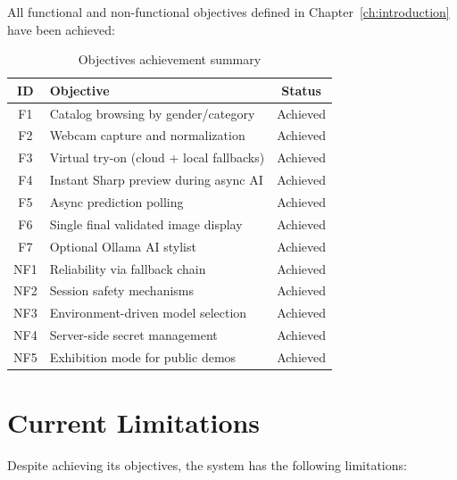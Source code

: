 All functional and non-functional objectives defined in Chapter~\ref{ch:introduction} have been achieved:

\begin{table}[H]
  \centering
  \caption{Objectives achievement summary}
  \label{tab:objectives-achieved}
  \begin{tabular}{@{}clc@{}}
    \toprule
    \textbf{ID} & \textbf{Objective} & \textbf{Status} \\
    \midrule
    F1 & Catalog browsing by gender/category & Achieved \\
    F2 & Webcam capture and normalization & Achieved \\
    F3 & Virtual try-on (cloud + local fallbacks) & Achieved \\
    F4 & Instant Sharp preview during async AI & Achieved \\
    F5 & Async prediction polling & Achieved \\
    F6 & Single final validated image display & Achieved \\
    F7 & Optional Ollama AI stylist & Achieved \\
    NF1 & Reliability via fallback chain & Achieved \\
    NF2 & Session safety mechanisms & Achieved \\
    NF3 & Environment-driven model selection & Achieved \\
    NF4 & Server-side secret management & Achieved \\
    NF5 & Exhibition mode for public demos & Achieved \\
    \bottomrule
  \end{tabular}
\end{table}

\section{Current Limitations}
\label{sec:limitations}

Despite achieving its objectives, the system has the following limitations:


